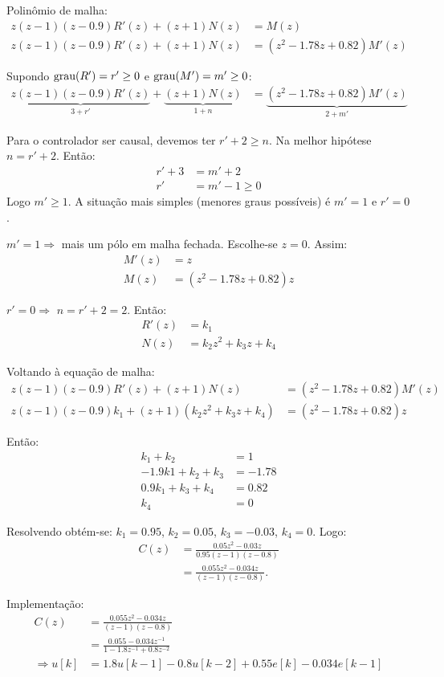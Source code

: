 \documentclass[12pt, a4paper]{article}
\begin{document}
Polinômio de malha:
\begin{align}
z(z-1)(z-0.9)R'(z)+(z+1)N(z) &= M(z)\\
z(z-1)(z-0.9)R'(z)+(z+1)N(z) &= (z^2-1.78z+0.82)M'(z)
\end{align}

Supondo $\text{grau}(R') = r'\geq 0$ e $\text{grau}(M')=m'\geq 0$:
\begin{align}
	 \underbrace{z(z-1)(z-0.9)R'(z)}_{3+r'}+\underbrace{(z+1)N(z)}_{1+n} &= \underbrace{(z^2-1.78z+0.82)M'(z)}_{2+m'}
\end{align}

Para o controlador ser causal, devemos ter $r'+2 \geq n$. Na melhor hipótese $n = r'+2$. Então:
\begin{align}
	r'+3 &= m'+2 \\
	r' &= m'-1 \geq 0
\end{align}
Logo $m'\geq 1$. A situação mais simples (menores graus possíveis) é  $m'=1$ e $r'=0$. 

$m'=1 \Rightarrow$  mais um pólo em malha fechada. Escolhe-se $z=0$. Assim:
\begin{align}
	M'(z) &= z\\
	M(z)&= (z^2-1.78z+0.82)z
\end{align}

$r'=0\Rightarrow$ $n=r'+2=2$. Então:
\begin{align}
	R'(z) &= k_1\\
	N(z) &= k_2z^2+k_3z+k_4
\end{align}

\pagebreak
Voltando à equação de malha:
\begin{align}
	z(z-1)(z-0.9)R'(z)+(z+1)N(z) &= (z^2-1.78z+0.82)M'(z)\\
	z(z-1)(z-0.9)k_1+(z+1)(k_2z^2+k_3z+k_4) &= (z^2-1.78z+0.82)z
\end{align}

Então:
\begin{align}
	k_1+k_2 &=1\\
	-1.9k1 + k_2 + k_3 &= -1.78\\
	0.9k_1 + k_3 + k_4 &= 0.82 \\
	k_4&= 0
\end{align}

Resolvendo obtém-se: $k_1=0.95$, $k_2=0.05$, $k_3=-0.03$, $k_4=0$. Logo:
\begin{align}
	C(z) &= \frac{0.05z^2-0.03z}{0.95(z-1)(z-0.8)}\\
	&= \frac{0.055z^2-0.034z}{(z-1)(z-0.8)}. 
\end{align}

Implementação:
\begin{align}
	C(z) &= \frac{0.055z^2-0.034z}{(z-1)(z-0.8)}\\
	&= \frac{0.055-0.034z^{-1}}{1-1.8z^{-1}+0.8z^{-2}} \\
	\Rightarrow u[k] &= 1.8u[k-1]-0.8u[k-2]+0.55e[k]-0.034e[k-1]
\end{align}
\end{document}
